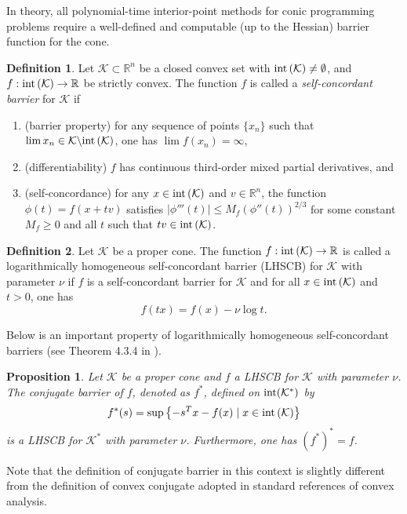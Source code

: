 \documentclass[11pt]{article}
\theoremstyle{definition}
\newtheorem{defin}{Definition}
\theoremstyle{plain}
\newtheorem{prop}{Proposition}
\begin{document}
In theory, all polynomial-time interior-point methods for conic programming problems require a well-defined and computable (up to the Hessian) barrier function for the cone.

\begin{defin}
	Let $\mathcal{K} \subset \mathbb{R}^n$ be a closed convex set with $\textnormal{int}\left(\mathcal{K}\right) \neq \emptyset$, and $f: \textnormal{int} \left(\mathcal{K}\right) \rightarrow \mathbb{R}$ be strictly convex. The function $f$ is called a \textit{self-concordant barrier} for $\mathcal{K}$  if 
	\begin{enumerate}
		\item (barrier property) for any sequence of points $\{x_n\}$ such that $\lim x_n \in \mathcal{K}\backslash \textnormal{int}\left(\mathcal{K}\right)$, one has $\lim f(x_n) = \infty$,
		\item (differentiability) $f$ has continuous third-order mixed partial derivatives, and
		\item (self-concordance) for any $x \in \textnormal{int}\left(\mathcal{K}\right)$ and $v \in \mathbb{R}^n$, the function $\phi(t) = f(x+tv)$ satisfies $|\phi ''' (t)|\leq M_f \left(\phi '' (t)\right)^{2/3}$ for some constant $M_f \geq 0$ and all $t$ such that $tv \in \textnormal{int}\left(\mathcal{K}\right)$.
	\end{enumerate}
\end{defin}

\begin{defin}
	Let $\mathcal{K}$ be a proper cone. The function $f: \textnormal{int}\left(\mathcal{K}\right)\rightarrow \mathbb{R}$ is called a logarithmically homogeneous self-concordant barrier (LHSCB) for $\mathcal{K}$ with parameter $\nu$ if $f$ is a self-concordant barrier for $\mathcal{K}$ and for all $x \in \textnormal{int}\left(\mathcal{K}\right)$ and $t>0$, one has 
	\[f(tx) = f(x) - \nu \log t.\]
\end{defin}

Below is an important property of logarithmically homogeneous self-concordant barriers (see Theorem 4.3.4 in \cite{Akle_thesis}).
\begin{prop} \label{conjugate_of_LHSCB_is_LHSCB_for_dual}
	Let $\mathcal{K}$ be a proper cone and $f$ a LHSCB for $\mathcal{K}$ with parameter $\nu$. The \textnormal{conjugate barrier} of $f$, denoted as $f^*$, defined on $\textnormal{int}(\mathcal{K}^*)$ by 
	\[f^*(s) = \sup \left\{-s^Tx -f(x) \mid x\in \textnormal{int}\left(\mathcal{K}\right)  \right\}\]
	is a LHSCB for $\mathcal{K}^*$ with parameter $\nu$. Furthermore, one has $(f^*)^* = f$.
\end{prop}
Note that the definition of conjugate barrier in this context is slightly different from the definition of convex conjugate adopted in standard references of convex analysis. \\
\end{document}
